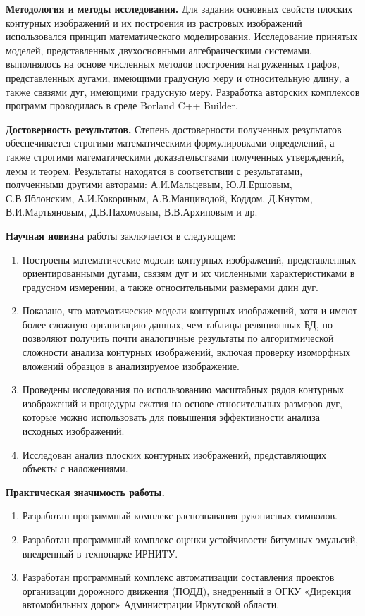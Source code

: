\textbf{Методология и методы исследования.} Для задания основных свойств  плоских контурных изображений и их построения из растровых изображений использовался  принцип математического моделирования. Исследование принятых моделей, представленных двухосновными алгебраическими системами, выполнялось на основе численных методов построения нагруженных графов, представленных дугами, имеющими градусную меру и относительную длину, а также связями дуг, имеющими градусную меру. Разработка авторских комплексов программ проводилась в среде Borland C++ Builder. 


\textbf{Достоверность  результатов.} Степень достоверности полученных результатов обеспечивается строгими математическими формулировками определений, а также строгими математическими доказательствами полученных утверждений, лемм и теорем.
Результаты находятся в соответствии с результатами, полученными другими авторами:  А.И.Мальцевым\cite{D12}, Ю.Л.Ершовым\cite{D12}, С.В.Яблонским\cite{D21}, А.И.Кокориным\cite{D10}, А.В.Манциводой\cite{D13},  Коддом\cite{D25}, Д.Кнутом\cite{D9}, В.И.Мартьяновым\cite{Samara}, Д.В.Пахомовым\cite{D16}, В.В.Архиповым\cite{D15} и др\cite{D1,D2,D3,D11}.

\textbf{Научная новизна} работы заключается в следующем: 
\begin{enumerate}
\item Построены математические модели контурных изображений, представленных ориентированными дугами, связям дуг и их численными характеристиками в градусном измерении,  а также  относительными размерами  длин дуг.  
\item Показано, что математические модели контурных изображений, хотя и имеют более сложную организацию данных, чем  таблицы реляционных БД, но позволяют получить почти аналогичные результаты по алгоритмической сложности  анализа контурных изображений, включая проверку изоморфных вложений образцов в анализируемое изображение.
\item Проведены исследования по использованию масштабных рядов контурных изображений и процедуры сжатия на  основе относительных размеров дуг, которые можно использовать для повышения эффективности анализа исходных изображений.
\item Исследован анализ плоских контурных изображений, представляющих объекты с наложениями.
\end{enumerate}

\pagebreak
\textbf{Практическая значимость работы.}
\begin{enumerate}
\item  Разработан  программный комплекс распознавания рукописных символов.
\item  Разработан  программный комплекс оценки устойчивости битумных эмульсий, внедренный в технопарке  ИРНИТУ.
\item  Разработан  программный комплекс автоматизации составления проектов организации дорожного движения (ПОДД), внедренный в ОГКУ «Дирекция автомобильных дорог» Администрации Иркутской области.
\end{enumerate}



